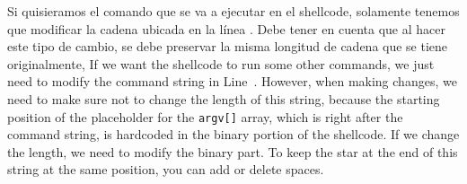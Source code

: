 Si quisieramos el comando que se va a ejecutar en el shellcode, solamente tenemos que modificar la cadena ubicada en la línea .
Debe tener en cuenta que al hacer este tipo de cambio, se debe preservar la misma longitud de cadena que se tiene originalmente,
If we want the shellcode to run some other commands,
we just need to modify the command string in Line~.
However, when making changes, we need to
make sure not to change the length of this string, because the
starting position of the placeholder for the \texttt{argv[]} array,
which is right after the command string,
is hardcoded in the binary portion of the shellcode. If
we change the length, we need to modify the binary part.
To keep the star at the end of this string at the same position,
you can add or delete spaces.


